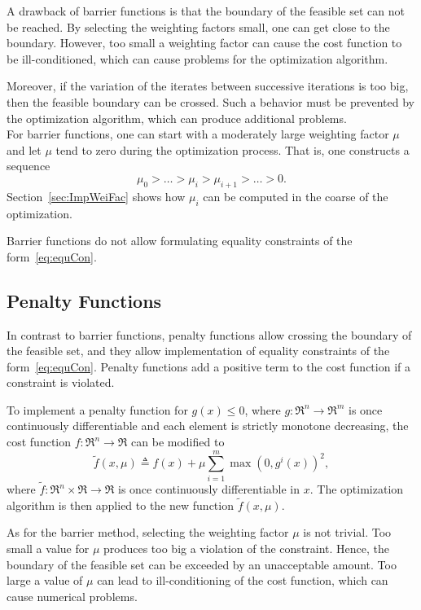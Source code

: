 \indent A drawback of barrier functions is that the boundary of the feasible set
can not be reached.
By selecting the weighting factors small, one can get close to the boundary. 
However, too small a weighting factor can cause the cost function to be ill-conditioned,
which can cause problems for the optimization algorithm.

Moreover, if the variation of the iterates between successive iterations is too big,
then the feasible boundary can be crossed. Such a behavior must be prevented
by the optimization algorithm, which can produce additional problems.\\


For barrier functions, one can start with a moderately large weighting factor $\mu$ 
and let $\mu$ tend to zero during the optimization process. 
That is, one constructs a sequence
\begin{equation}
  \mu_0 > \ldots > \mu_i > \mu_{i+1} > \ldots > 0.
  \label{eq:barFunWeiFac}
\end{equation}
Section~\ref{sec:ImpWeiFac} shows how $\mu_i$ can be computed in the coarse of the optimization.

Barrier functions do not allow formulating equality constraints of the form~\eqref{eq:equCon}.

\subsection{Penalty Functions}

In contrast to barrier functions, 
penalty functions allow crossing the boundary of the feasible set, and they allow
implementation of equality constraints of the form~\eqref{eq:equCon}. 
Penalty functions add a positive term to the cost function if a constraint is violated.

\noindent To implement a penalty function for $g(x) \le 0$, where
$g \colon \Re^n \to \Re^m$ is once continuously differentiable and each element is strictly
monotone decreasing,
the cost function $f \colon \Re^n \to \Re$ can
be modified to
\begin{equation}
\widetilde f(x, \mu) \triangleq f(x) + \mu  \sum_{i=1}^m \max(0,  g^i(x))^2,
\label{eq:penFun}
\end{equation}
where $\widetilde f \colon \Re^n \times \Re \to \Re$ is once continuously differentiable in $x$.
The optimization algorithm is then applied to the new function $\widetilde f(x,\mu)$.

As for the barrier method, selecting the weighting factor $\mu$ is not trivial.
Too small a value for $\mu$ produces too big a violation of the constraint.
Hence, the boundary of the feasible set can be exceeded by an unacceptable amount.
Too large a value of $\mu$ can lead to ill-conditioning of the cost function,
which can cause numerical problems.\\

